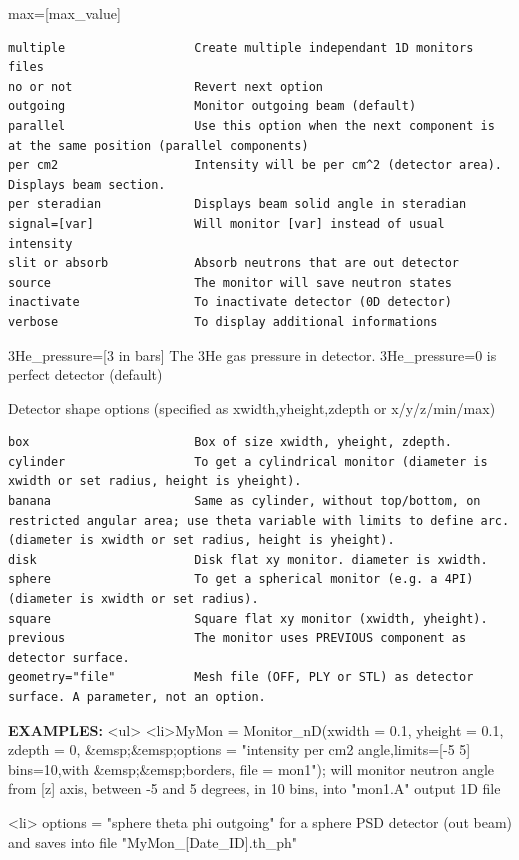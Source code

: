 max=[max\_value]

\begin{verbatim}
multiple                  Create multiple independant 1D monitors files
no or not                 Revert next option
outgoing                  Monitor outgoing beam (default)
parallel                  Use this option when the next component is at the same position (parallel components)
per cm2                   Intensity will be per cm^2 (detector area). Displays beam section.
per steradian             Displays beam solid angle in steradian
signal=[var]              Will monitor [var] instead of usual intensity
slit or absorb            Absorb neutrons that are out detector
source                    The monitor will save neutron states
inactivate                To inactivate detector (0D detector)
verbose                   To display additional informations
\end{verbatim}

3He\_pressure=[3 in bars] The 3He gas pressure in detector. 3He\_pressure=0 is perfect detector (default)

Detector shape options (specified as xwidth,yheight,zdepth or x/y/z/min/max)

\begin{verbatim}
box                       Box of size xwidth, yheight, zdepth.
cylinder                  To get a cylindrical monitor (diameter is xwidth or set radius, height is yheight).
banana                    Same as cylinder, without top/bottom, on restricted angular area; use theta variable with limits to define arc. (diameter is xwidth or set radius, height is yheight).
disk                      Disk flat xy monitor. diameter is xwidth.
sphere                    To get a spherical monitor (e.g. a 4PI) (diameter is xwidth or set radius).
square                    Square flat xy monitor (xwidth, yheight).
previous                  The monitor uses PREVIOUS component as detector surface.
geometry="file"           Mesh file (OFF, PLY or STL) as detector surface. A parameter, not an option.
\end{verbatim}

\textbf{EXAMPLES:} \textless{}ul\textgreater{} \textless{}li\textgreater{}MyMon = Monitor\_nD(xwidth = 0.1, yheight = 0.1, zdepth = 0, \&emsp;\&emsp;options = "intensity per cm2 angle,limits=[-5 5] bins=10,with \&emsp;\&emsp;borders, file = mon1"); will monitor neutron angle from [z] axis, between -5 and 5 degrees, in 10 bins, into "mon1.A" output 1D file

\textless{}li\textgreater{} options = "sphere theta phi outgoing" for a sphere PSD detector (out beam) and saves into file "MyMon\_[Date\_ID].th\_ph"

